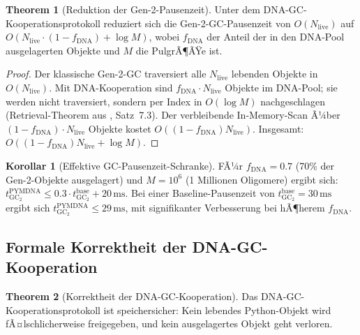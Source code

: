 ﻿\documentclass[a4paper,12pt]{article}
\theoremstyle{definition}
\newtheorem{korollar}{Korollar}[section]
\newtheorem{theorem}{Theorem}[section]
\begin{document}
\begin{theorem}[Reduktion der Gen-2-Pausenzeit]
  \label{thm:gc_pausenzeit}
  Unter dem DNA-GC-Kooperationsproto\-koll reduziert sich die Gen-2-GC-Pausenzeit
  von $O(N_{\mathrm{live}})$ auf $O(N_{\mathrm{live}} \cdot (1 - f_{\mathrm{DNA}})
  + \log M)$, wobei $f_{\mathrm{DNA}}$ der Anteil der in den DNA-Pool
  ausgelagerten Objekte und $M$ die PulgrÃ¶ÃŸe ist.
\end{theorem}

\begin{proof}
  Der klassische Gen-2-GC traversiert alle $N_{\mathrm{live}}$ lebenden Objekte
  in $O(N_{\mathrm{live}})$. Mit DNA-Kooperation sind $f_{\mathrm{DNA}} \cdot N_{\mathrm{live}}$
  Objekte im DNA-Pool; sie werden nicht traversiert, sondern per Index in
  $O(\log M)$ nachgeschlagen (Retrieval-Theorem aus \cite{epp2026dnastor},
  Satz~7.3). Der verbleibende In-Memory-Scan Ã¼ber
  $(1-f_{\mathrm{DNA}}) \cdot N_{\mathrm{live}}$ Objekte kostet
  $O((1-f_{\mathrm{DNA}}) N_{\mathrm{live}})$. Insgesamt:
  $O((1-f_{\mathrm{DNA}}) N_{\mathrm{live}} + \log M)$.
\end{proof}

\begin{korollar}[Effektive GC-Pausenzeit-Schranke]
  FÃ¼r $f_{\mathrm{DNA}} = 0.7$ (70\% der Gen-2-Objekte ausgelagert) und
  $M = 10^6$ (1 Millionen Oligomere) ergibt sich:
  $t_{\mathrm{GC}_2}^{\mathrm{PYMDNA}} \le 0.3 \cdot t_{\mathrm{GC}_2}^{\mathrm{base}} + 20\,\mathrm{ms}$.
  Bei einer Baseline-Pausenzeit von $t_{\mathrm{GC}_2}^{\mathrm{base}} = 30\,\mathrm{ms}$
  ergibt sich $t_{\mathrm{GC}_2}^{\mathrm{PYMDNA}} \le 29\,\mathrm{ms}$,
  mit signifikanter Verbesserung bei hÃ¶herem $f_{\mathrm{DNA}}$.
\end{korollar}

\subsection{Formale Korrektheit der DNA-GC-Kooperation}

\begin{theorem}[Korrektheit der DNA-GC-Kooperation]
  \label{thm:dna_gc_korrekt}
  Das DNA-GC-Kooperationsproto\-koll ist speichersicher: Kein lebendes
  Python-Objekt wird fÃ¤lschlicherweise freigegeben, und kein
  ausgelagertes Objekt geht verloren.
\end{theorem}
\end{document}
